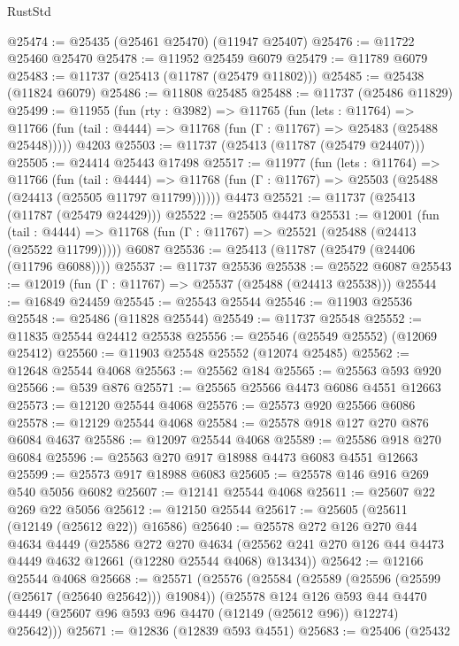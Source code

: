 \begin{lexlean}{RustStd}
\begin{coremodule}
@25474 := @25435 (@25461 @25470) (@11947 @25407)
@25476 := @11722 @25460 @25470
@25478 := @11952 @25459 @6079
@25479 := @11789 @6079
@25483 := @11737 (@25413 (@11787 (@25479 @11802)))
@25485 := @25438 (@11824 @6079)
@25486 := @11808 @25485
@25488 := @11737 (@25486 @11829)
@25499 := @11955
    (fun (rty : @3982) =>
    @11765
      (fun (lets : @11764) =>
      @11766 (fun (tail : @4444) => @11768 (fun (Γ : @11767) => @25483 (@25488 @25448)))))
    @4203
@25503 := @11737 (@25413 (@11787 (@25479 @24407)))
@25505 := @24414 @25443 @17498
@25517 := @11977
    (fun (lets : @11764) =>
    @11766
      (fun (tail : @4444) =>
      @11768 (fun (Γ : @11767) => @25503 (@25488 (@24413 (@25505 @11797 @11799))))))
    @4473
@25521 := @11737 (@25413 (@11787 (@25479 @24429)))
@25522 := @25505 @4473
@25531 := @12001
    (fun (tail : @4444) => @11768 (fun (Γ : @11767) => @25521 (@25488 (@24413 (@25522 @11799)))))
    @6087
@25536 := @25413 (@11787 (@25479 (@24406 (@11796 @6088))))
@25537 := @11737 @25536
@25538 := @25522 @6087
@25543 := @12019 (fun (Γ : @11767) => @25537 (@25488 (@24413 @25538)))
@25544 := @16849 @24459
@25545 := @25543 @25544
@25546 := @11903 @25536
@25548 := @25486 (@11828 @25544)
@25549 := @11737 @25548
@25552 := @11835 @25544 @24412 @25538
@25556 := @25546 (@25549 @25552) (@12069 @25412)
@25560 := @11903 @25548 @25552 (@12074 @25485)
@25562 := @12648 @25544 @4068
@25563 := @25562 @184
@25565 := @25563 @593 @920
@25566 := @539 @876
@25571 := @25565 @25566 @4473 @6086 @4551 @12663
@25573 := @12120 @25544 @4068
@25576 := @25573 @920 @25566 @6086
@25578 := @12129 @25544 @4068
@25584 := @25578 @918 @127 @270 @876 @6084 @4637
@25586 := @12097 @25544 @4068
@25589 := @25586 @918 @270 @6084
@25596 := @25563 @270 @917 @18988 @4473 @6083 @4551 @12663
@25599 := @25573 @917 @18988 @6083
@25605 := @25578 @146 @916 @269 @540 @5056 @6082
@25607 := @12141 @25544 @4068
@25611 := @25607 @22 @269 @22 @5056
@25612 := @12150 @25544
@25617 := @25605 (@25611 (@12149 (@25612 @22)) @16586)
@25640 := @25578
    @272
    @126
    @270
    @44
    @4634
    @4449
    (@25586
      @272
      @270
      @4634
      (@25562 @241 @270 @126 @44 @4473 @4449 @4632 @12661 (@12280 @25544 @4068) @13434))
@25642 := @12166 @25544 @4068
@25668 := @25571
    (@25576
      (@25584
        (@25589 (@25596 (@25599 (@25617 (@25640 @25642))) @19084))
        (@25578
          @124
          @126
          @593
          @44
          @4470
          @4449
          (@25607 @96 @593 @96 @4470 (@12149 (@25612 @96)) @12274)
          @25642)))
@25671 := @12836 (@12839 @593 @4551)
@25683 := @25406
    (@25432

\end{coremodule}
\end{lexlean}
